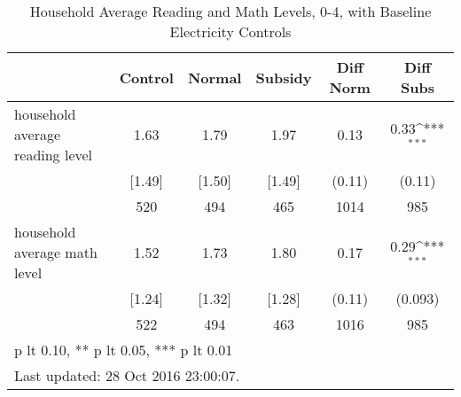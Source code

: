 \begin{table}[htbp]\centering
\def\sym#1{\ifmmode^{#1}\else\(^{#1}\)\fi}
\caption{Household Average Reading and Math Levels, 0-4, with Baseline Electricity Controls \label{tab:"balance"}}
\begin{tabular*}{0.9\hsize}{@{\hskip\tabcolsep\extracolsep\fill}l*{1}{ccccc}}
\toprule
                                &  Control&   Normal&  Subsidy&Diff Norm         &Diff Subs         \\
\midrule
household average reading level &     1.63&     1.79&     1.97&     0.13         &     0.33\sym{***}\\
                                &   [1.49]&   [1.50]&   [1.49]&   (0.11)         &   (0.11)         \\
                                &      520&      494&      465&     1014         &      985         \\
household average math level    &     1.52&     1.73&     1.80&     0.17         &     0.29\sym{***}\\
                                &   [1.24]&   [1.32]&   [1.28]&   (0.11)         &  (0.093)         \\
                                &      522&      494&      463&     1016         &      985         \\
\bottomrule
\multicolumn{6}{l}{\footnotesize * p lt 0.10, ** p lt 0.05, *** p lt 0.01}\\
\multicolumn{6}{l}{\footnotesize Last updated: 28 Oct 2016 23:00:07.}\\
\end{tabular*}
\end{table}
